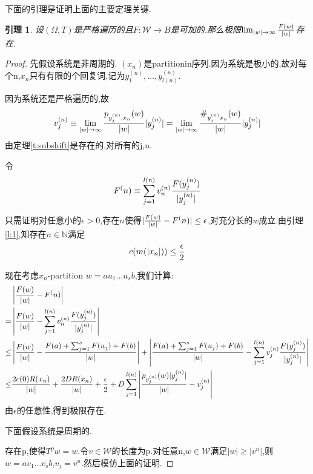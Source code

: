 \documentclass[a4paper,11pt,oneside]{book}
\newtheorem{lemma}{\textbf{\hspace{0.7cm}引理}}[section]
\begin{document}
下面的引理是证明上面的主要定理关键.

\begin{lemma}
\label{l:2}
设$(\Omega,T)$是严格遍历的且$F:\mathcal{W}\rightarrow B$是可加的.那么极限$\lim_{|w|\to \infty}{F(w)\over |w|}$存在.
\end{lemma}

\begin{proof}
先假设系统是非周期的.
$(x_n)$是partitionin序列.因为系统是极小的,故对每个n,$x_n$只有有限的个回复词,记为$y_1^{(n)},\ldots,y_{l(n)}^{(n)}$.

因为系统还是严格遍历的,故
$$v_j^{(n)}\equiv \lim_{|w|\to \infty}{p_{y_j^{(n)},x_n}(w)\over |w|}|y_j^{(n)}|=\lim_{|w|\to \infty}{\#_{y_j^{(n)}x_n}(w)\over |w|}|y_j^{(n)}|$$
由定理\ref{t:subshift}是存在的,对所有的j,n.

令$$F^(n)\equiv \sum_{j=1}^{l(n)}v_n^{(n)}{F(y_j^{(n)})\over |y_j^{(n)}|}$$

只需证明对任意小的$\epsilon>0$,存在$n$使得$|{F(w)\over |w|}-F^(n)|\leq \epsilon$,对充分长的$w$成立.由引理\ref{l:1},知存在$n\in\mathbb{N}$满足
$$c(m(|x_n|))\leq {\epsilon\over 2}$$

现在考虑$x_n$-partition $w=au_1\ldots u_sb$,我们计算:
\begin{align*}
&\left|{F(w)\over |w|}-F^(n)\right|\\
=&\left|{F(w)\over |w|}-\sum_{j=1}^{l(n)}v_n^{(n)}{F(y_j^{(n)})\over |y_j^{(n)}|}\right|\\
\leq & \left|{F(w)\over |w|}-{F(a)+\sum_{j=1}^sF(u_j)+F(b)\over |w|}\right|+\left|{F(a)+\sum_{j=1}^sF(u_j)+F(b)\over |w|}-\sum_{j=1}^{l(n)}v_j^{(n)}{F(y_j^{(n)})\over |y_j^{(n)}|}\right| \\
\leq &{2c(0)R(x_n)\over |w|}+{2DR(x_n)\over |w|}+{\epsilon\over 2}+D\sum_{j=1}^{l(n)}\left|{p_{y_j^{(n)}}(w)|y_j^{(n)}|\over |w|}-v_j^{(n)}\right|
\end{align*}
由$\epsilon$的任意性,得到极限存在.

下面假设系统是周期的.

存在p,使得$T^pw=w$.令$v\in \mathcal{W}$的长度为p.对任意n,$w\in\mathcal{W}$满足$|w|\geq |v^n|$,则$w=av_1\ldots v_sb$,$v_j=v^n$.然后模仿上面的证明.
\end{proof}
\end{document}
